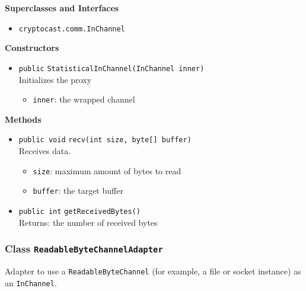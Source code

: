 \textbf{Superclasses and Interfaces}
\begin{itemize}
\item \lstinline|cryptocast.comm.InChannel|
\end{itemize}



\textbf{Constructors}
\begin{itemize}
\item \lstinline|public| \lstinline|StatisticalInChannel|\lstinline|(InChannel inner)|\\
Initializes the proxy
\begin{itemize}
\item \lstinline|inner|: the wrapped channel
\end{itemize}



\end{itemize}


\textbf{Methods}
\begin{itemize}
\item \lstinline|public void| \lstinline|recv|\lstinline|(int size, byte[] buffer)|\\
Receives data.
\begin{itemize}
\item \lstinline|size|: maximum amount of bytes to read
\item \lstinline|buffer|: the target buffer
\end{itemize}



\item \lstinline|public int| \lstinline|getReceivedBytes|\lstinline|()|\\
Returns: the number of received bytes



\end{itemize}

\subsubsection{Class \lstinline|ReadableByteChannelAdapter|}
Adapter to use a \lstinline|ReadableByteChannel| (for example, a file or socket instance) as an
 \lstinline|InChannel|. \\



